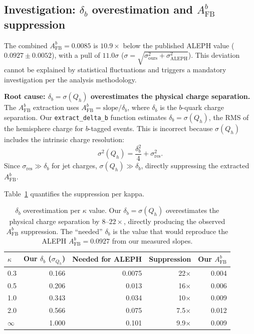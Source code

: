 \documentclass[11pt,a4paper]{article}
\begin{document}
\subsection{Investigation: $\delta_b$ overestimation and $A_\mathrm{FB}^b$ suppression}
\label{sec:delta_b_investigation}

The combined $A_\mathrm{FB}^b = 0.0085$ is $10.9\times$ below the published ALEPH
value ($0.0927 \pm 0.0052$), with a pull of $11.0\sigma$
($\sigma = \sqrt{\sigma_\mathrm{ours}^2 + \sigma_\mathrm{ALEPH}^2}$). This deviation cannot be
explained by statistical fluctuations and triggers a mandatory investigation per the
analysis methodology.

\textbf{Root cause: $\delta_b = \sigma(Q_h)$ overestimates the physical charge separation.}
The $A_\mathrm{FB}^b$ extraction uses $A_\mathrm{FB}^b = \mathrm{slope} / \delta_b$,
where $\delta_b$ is the $b$-quark charge separation. Our \texttt{extract\_delta\_b}
function estimates $\delta_b = \sigma(Q_h)$, the RMS of the hemisphere charge for
$b$-tagged events. This is incorrect because $\sigma(Q_h)$ includes the intrinsic
charge resolution:
\begin{equation}
\sigma^2(Q_h) = \frac{\delta_b^2}{4} + \sigma_\mathrm{res}^2.
\label{eq:delta_b_decomposition}
\end{equation}
Since $\sigma_\mathrm{res} \gg \delta_b$ for jet charges, $\sigma(Q_h) \gg \delta_b$,
directly suppressing the extracted $A_\mathrm{FB}^b$.

Table~\ref{tab:delta_b_suppression} quantifies the suppression per kappa.

\begin{table}[htbp]
\centering
\caption{$\delta_b$ overestimation per $\kappa$ value. Our $\delta_b = \sigma(Q_h)$
overestimates the physical charge separation by $8$--$22\times$, directly producing
the observed $A_\mathrm{FB}^b$ suppression. The ``needed'' $\delta_b$ is the value
that would reproduce the ALEPH $A_\mathrm{FB}^b = 0.0927$ from our measured slopes.}
\label{tab:delta_b_suppression}
\begin{tabular}{lrrrr}
\toprule
$\kappa$ & Our $\delta_b$ ($\sigma_{Q_h}$) & Needed for ALEPH & Suppression & Our $A_\mathrm{FB}^b$ \\
\midrule
0.3 & 0.166 & 0.0075 & 22$\times$ & 0.004 \\
0.5 & 0.206 & 0.013 & 16$\times$ & 0.006 \\
1.0 & 0.343 & 0.034 & 10$\times$ & 0.009 \\
2.0 & 0.566 & 0.075 & 7.5$\times$ & 0.012 \\
$\infty$ & 1.000 & 0.101 & 9.9$\times$ & 0.009 \\
\bottomrule
\end{tabular}
\end{table}
\end{document}
